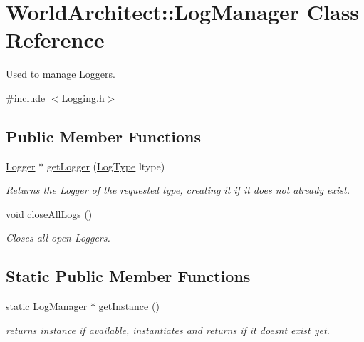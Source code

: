 \hypertarget{class_world_architect_1_1_log_manager}{}\section{World\+Architect\+::Log\+Manager Class Reference}
\label{class_world_architect_1_1_log_manager}


Used to manage Loggers.  




{\ttfamily \#include $<$Logging.\+h$>$}

\subsection*{Public Member Functions}
\begin{DoxyCompactItemize}
\item 
\mbox{\hyperlink{class_world_architect_1_1_logger}{Logger}} $\ast$ \mbox{\hyperlink{class_world_architect_1_1_log_manager_acd160df28467052ffcb0adac0a5ec40b}{get\+Logger}} (\mbox{\hyperlink{namespace_world_architect_adf13e54f2c38346ed9d5013cff07fc8e}{Log\+Type}} ltype)
\begin{DoxyCompactList}\small\item\em Returns the \mbox{\hyperlink{class_world_architect_1_1_logger}{Logger}} of the requested type, creating it if it does not already exist. \end{DoxyCompactList}\item 
void \mbox{\hyperlink{class_world_architect_1_1_log_manager_aa237d20cfb9e2843bd0f13d70dd5e7f3}{close\+All\+Logs}} ()
\begin{DoxyCompactList}\small\item\em Closes all open Loggers. \end{DoxyCompactList}\end{DoxyCompactItemize}
\subsection*{Static Public Member Functions}
\begin{DoxyCompactItemize}
\item 
static \mbox{\hyperlink{class_world_architect_1_1_log_manager}{Log\+Manager}} $\ast$ \mbox{\hyperlink{class_world_architect_1_1_log_manager_adc7504f084d4cc05071328651efcb272}{get\+Instance}} ()
\begin{DoxyCompactList}\small\item\em returns instance if available, instantiates and returns if it doesn\textquotesingle{}t exist yet. \end{DoxyCompactList}\end{DoxyCompactItemize}


